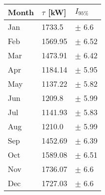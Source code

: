 \begin{tabular}{lll}
\toprule
Month & $\tau$ [kW] &   $I_{95\%}$ \\
\midrule
  Jan &      1733.5 &    $\pm$ 6.6 \\
  Feb &     1569.95 &   $\pm$ 6.52 \\
  Mar &     1473.91 &   $\pm$ 6.42 \\
  Apr &     1184.14 &   $\pm$ 5.95 \\
  May &     1137.22 &   $\pm$ 5.82 \\
  Jun &      1209.8 &   $\pm$ 5.99 \\
  Jul &     1141.93 &   $\pm$ 5.83 \\
  Aug &      1210.0 &   $\pm$ 5.99 \\
  Sep &     1452.69 &   $\pm$ 6.39 \\
  Oct &     1589.08 &   $\pm$ 6.51 \\
  Nov &     1736.07 &    $\pm$ 6.6 \\
  Dec &     1727.03 &    $\pm$ 6.6 \\
\bottomrule
\end{tabular}
